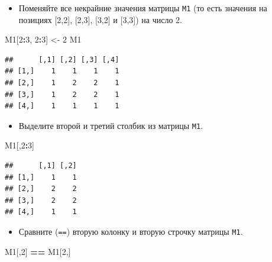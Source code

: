 \documentclass[]{book}
\newenvironment{Shaded}{\begin{snugshade}}{\end{snugshade}}
\newcommand{\DecValTok}[1]{\textcolor[rgb]{0.00,0.00,0.81}{#1}}
\newcommand{\StringTok}[1]{\textcolor[rgb]{0.31,0.60,0.02}{#1}}
\newcommand{\OperatorTok}[1]{\textcolor[rgb]{0.81,0.36,0.00}{\textbf{#1}}}
\newcommand{\NormalTok}[1]{#1}
\providecommand{\tightlist}{%
  \setlength{\itemsep}{0pt}\setlength{\parskip}{0pt}}
\begin{document}
\begin{itemize}
\tightlist
\item
  Поменяйте все некрайние значения матрицы \texttt{M1} (то есть значения
  на позициях {[}2,2{]}, {[}2,3{]}, {[}3,2{]} и {[}3,3{]}) на число 2.
\end{itemize}

\begin{Shaded}
\begin{Highlighting}[]
\NormalTok{M1[}\DecValTok{2}\OperatorTok{:}\DecValTok{3}\NormalTok{, }\DecValTok{2}\OperatorTok{:}\DecValTok{3}\NormalTok{] <-}\StringTok{ }\DecValTok{2}
\NormalTok{M1}
\end{Highlighting}
\end{Shaded}

\begin{verbatim}
##      [,1] [,2] [,3] [,4]
## [1,]    1    1    1    1
## [2,]    1    2    2    1
## [3,]    1    2    2    1
## [4,]    1    1    1    1
\end{verbatim}

\begin{itemize}
\tightlist
\item
  Выделите второй и третий столбик из матрицы \texttt{M1}.
\end{itemize}

\begin{Shaded}
\begin{Highlighting}[]
\NormalTok{M1[,}\DecValTok{2}\OperatorTok{:}\DecValTok{3}\NormalTok{]}
\end{Highlighting}
\end{Shaded}

\begin{verbatim}
##      [,1] [,2]
## [1,]    1    1
## [2,]    2    2
## [3,]    2    2
## [4,]    1    1
\end{verbatim}

\begin{itemize}
\tightlist
\item
  Сравните (\texttt{==}) вторую колонку и вторую строчку матрицы
  \texttt{M1}.
\end{itemize}

\begin{Shaded}
\begin{Highlighting}[]
\NormalTok{M1[,}\DecValTok{2}\NormalTok{] }\OperatorTok{==}\StringTok{ }\NormalTok{M1[}\DecValTok{2}\NormalTok{,]}
\end{Highlighting}
\end{Shaded}
\end{document}
